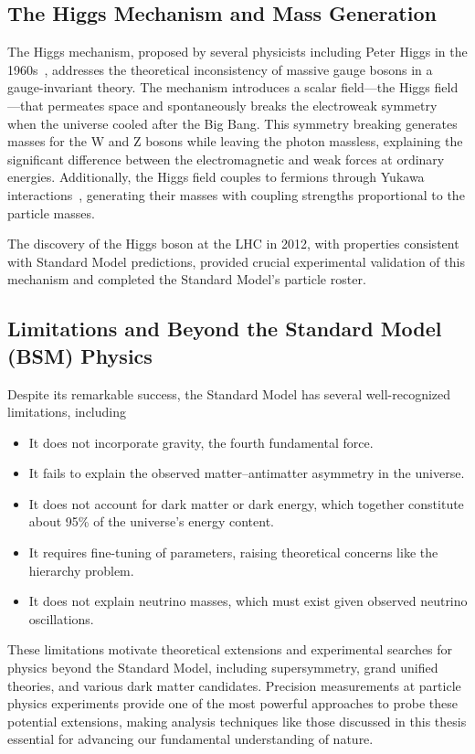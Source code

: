 \begin{definition}
\subsection{The Higgs Mechanism and Mass Generation}
The Higgs mechanism, proposed by several physicists including Peter Higgs in the 1960s~\cite{PhysRevLett.13.508}, addresses the theoretical inconsistency of massive gauge bosons in a gauge-invariant theory.
%
The mechanism introduces a scalar field---the Higgs field---that permeates space and spontaneously breaks the electroweak symmetry when the universe cooled after the Big Bang.
%
This symmetry breaking generates masses for the W and Z bosons while leaving the photon massless, explaining the significant difference between the electromagnetic and weak forces at ordinary energies. Additionally, the Higgs field couples to fermions through Yukawa interactions~\cite{DHoker1984DecouplingTheory}, generating their masses with coupling strengths proportional to the particle masses.

The discovery of the Higgs boson at the LHC in 2012, with properties consistent with Standard Model predictions, provided crucial experimental validation of this mechanism and completed the Standard Model's particle roster.

\subsection{Limitations and Beyond the Standard Model (BSM) Physics}
Despite its remarkable success, the Standard Model has several well-recognized limitations, including

    \begin{itemize}
        \item It does not incorporate gravity, the fourth fundamental force.
        \item It fails to explain the observed matter--antimatter asymmetry in the universe.
        \item It does not account for dark matter or dark energy, which together constitute about 95\% of the universe's energy content.
        \item  It requires fine-tuning of parameters, raising theoretical concerns like the hierarchy problem.
        \item  It does not explain neutrino masses, which must exist given observed neutrino oscillations.
    \end{itemize}
These limitations motivate theoretical extensions and experimental searches for physics beyond the Standard Model, including supersymmetry, grand unified theories, and various dark matter candidates.
%
Precision measurements at particle physics experiments provide one of the most powerful approaches to probe these potential extensions, making analysis techniques like those discussed in this thesis essential for advancing our fundamental understanding of nature.


\end{definition}
